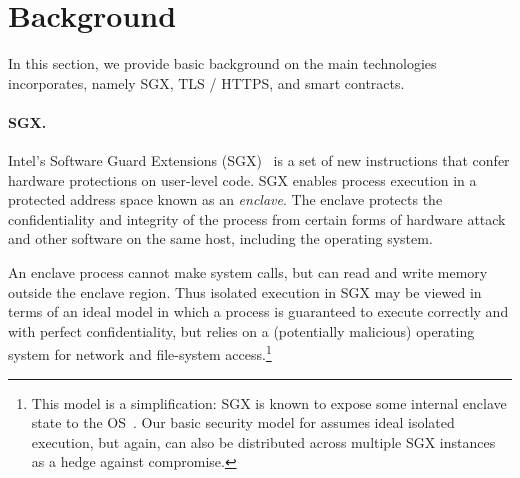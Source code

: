 \section{Background}
\label{sec:background}

In this section, we provide basic background on the main technologies \tc incorporates, namely SGX, TLS / HTTPS, and smart contracts.

\paragraph{\bf SGX.}
Intel's Software Guard Extensions (SGX)~
\cite{McKeen:2013jv,anati2013innovative,Phegade:2013km,sgxmanual}
is a set of new instructions that confer hardware protections on user-level code. SGX enables process execution in a protected address space known as an {\em enclave}.
The enclave protects the confidentiality and integrity of the process from certain forms of hardware attack and other software on the same host, including the operating system. 

An enclave process cannot make system calls, but can read and write memory outside the enclave region. Thus isolated execution in SGX may be viewed in terms of an ideal model in which a process is guaranteed to execute correctly and with perfect confidentiality, but relies on a (potentially malicious) operating system for network and file-system access.\footnote{This model is a simplification: SGX is known to expose some internal enclave state to the OS~\cite{sgxexplained}. Our basic security model for \tc assumes ideal isolated execution, but again, \tc can also be distributed across multiple SGX instances as a hedge against compromise.}

